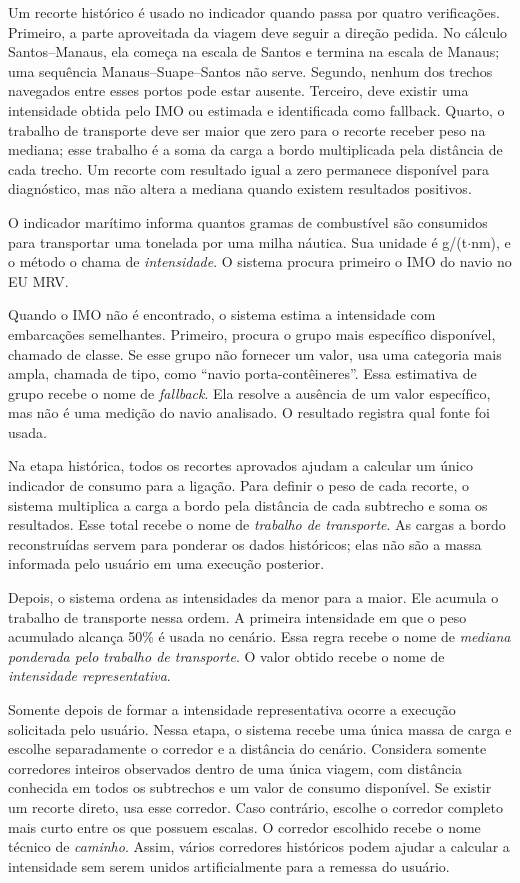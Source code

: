 Um recorte histórico é usado no indicador quando passa por quatro verificações. Primeiro, a parte aproveitada da viagem deve seguir a direção pedida. No cálculo Santos--Manaus, ela começa na escala de Santos e termina na escala de Manaus; uma sequência Manaus--Suape--Santos não serve. Segundo, nenhum dos trechos navegados entre esses portos pode estar ausente. Terceiro, deve existir uma intensidade obtida pelo IMO ou estimada e identificada como fallback. Quarto, o trabalho de transporte deve ser maior que zero para o recorte receber peso na mediana; esse trabalho é a soma da carga a bordo multiplicada pela distância de cada trecho. Um recorte com resultado igual a zero permanece disponível para diagnóstico, mas não altera a mediana quando existem resultados positivos.

O indicador marítimo informa quantos gramas de combustível são consumidos para transportar uma tonelada por uma milha náutica. Sua unidade é g/(t$\cdot$nm), e o método o chama de \emph{intensidade}. O sistema procura primeiro o IMO do navio no EU MRV.

Quando o IMO não é encontrado, o sistema estima a intensidade com embarcações semelhantes. Primeiro, procura o grupo mais específico disponível, chamado de classe. Se esse grupo não fornecer um valor, usa uma categoria mais ampla, chamada de tipo, como ``navio porta-contêineres''. Essa estimativa de grupo recebe o nome de \emph{fallback}. Ela resolve a ausência de um valor específico, mas não é uma medição do navio analisado. O resultado registra qual fonte foi usada.

Na etapa histórica, todos os recortes aprovados ajudam a calcular um único indicador de consumo para a ligação. Para definir o peso de cada recorte, o sistema multiplica a carga a bordo pela distância de cada subtrecho e soma os resultados. Esse total recebe o nome de \emph{trabalho de transporte}. As cargas a bordo reconstruídas servem para ponderar os dados históricos; elas não são a massa informada pelo usuário em uma execução posterior.

Depois, o sistema ordena as intensidades da menor para a maior. Ele acumula o trabalho de transporte nessa ordem. A primeira intensidade em que o peso acumulado alcança 50\% é usada no cenário. Essa regra recebe o nome de \emph{mediana ponderada pelo trabalho de transporte}. O valor obtido recebe o nome de \emph{intensidade representativa}.

Somente depois de formar a intensidade representativa ocorre a execução solicitada pelo usuário. Nessa etapa, o sistema recebe uma única massa de carga e escolhe separadamente o corredor e a distância do cenário. Considera somente corredores inteiros observados dentro de uma única viagem, com distância conhecida em todos os subtrechos e um valor de consumo disponível. Se existir um recorte direto, usa esse corredor. Caso contrário, escolhe o corredor completo mais curto entre os que possuem escalas. O corredor escolhido recebe o nome técnico de \emph{caminho}. Assim, vários corredores históricos podem ajudar a calcular a intensidade sem serem unidos artificialmente para a remessa do usuário.


